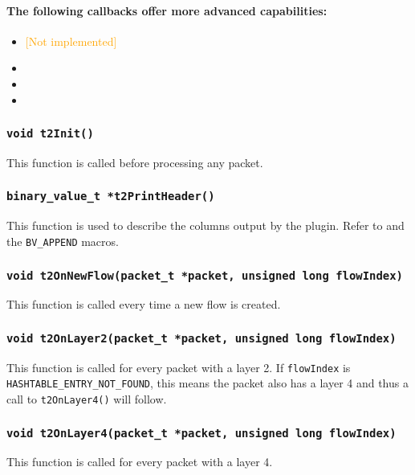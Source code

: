 \documentclass[documentation]{subfiles}
\begin{document}
\paragraph{The following callbacks offer more advanced capabilities:}
\begin{itemize}
    \item {\tt{}} \textcolor{orange}{[Not implemented]}
    \item {\tt{}}
    \item {\tt{}}
    \item {\tt{}}
\end{itemize}


\subsubsection{\tt void t2Init()}\label{t2cb-t2Init}
This function is called before processing any packet.

\subsubsection{\tt binary\_value\_t *t2PrintHeader()}\label{t2cb-t2PrintHeader}
This function is used to describe the columns output by the plugin.
Refer to  and the {\tt BV\_APPEND} macros.

\subsubsection{\tt void t2OnNewFlow(packet\_t *packet, unsigned long flowIndex)}\label{t2cb-t2OnNewFlow}
This function is called every time a new flow is created.

\subsubsection{\tt void t2OnLayer2(packet\_t *packet, unsigned long flowIndex)}\label{t2cb-t2OnLayer2}
This function is called for every packet with a layer 2.
If {\tt flowIndex} is {\tt HASHTABLE\_ENTRY\_NOT\_FOUND}, this means the packet also has
a layer 4 and thus a call to {\tt t2OnLayer4()} will follow.

\subsubsection{\tt void t2OnLayer4(packet\_t *packet, unsigned long flowIndex)}\label{t2cb-t2OnLayer4}
This function is called for every packet with a layer 4.
\end{document}
